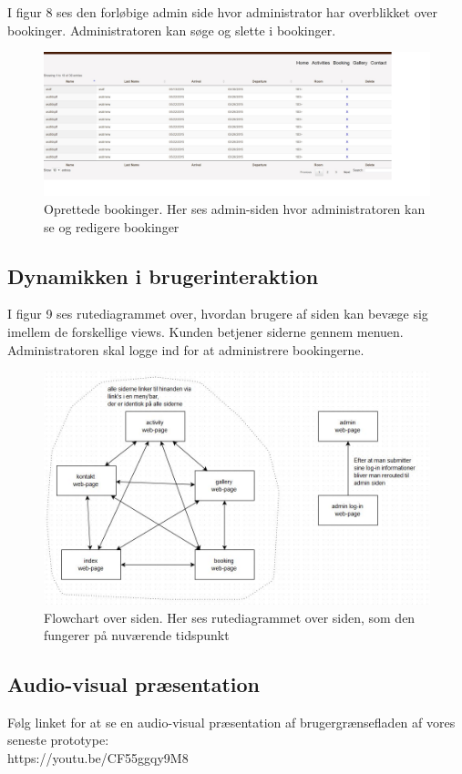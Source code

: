 \documentclass[12pt,a4paper]{article}
\begin{document}
\newpage
I figur 8 ses den forløbige admin side hvor administrator har overblikket
over bookinger. Administratoren kan søge og slette i bookinger. 
\begin{figure}[H]
\centering
\includegraphics[scale=0.4] {brugergransefladebilled3.jpg}
\caption{Oprettede bookinger. Her ses admin-siden hvor administratoren kan se og redigere bookinger}
\end{figure}

\subsection{Dynamikken i brugerinteraktion}
I figur 9 ses rutediagrammet over, 
hvordan brugere af siden kan bevæge sig imellem de forskellige views. 
Kunden betjener siderne gennem menuen.
Administratoren skal logge ind for at administrere bookingerne.
\begin{figure}[H]
\centering
\includegraphics[scale=0.6] {flowchart.jpg}
\caption{Flowchart over siden. Her ses rutediagrammet over siden, som den fungerer på nuværende tidspunkt}
\end{figure}
\newpage
\subsection{Audio-visual præsentation}
Følg linket for at se en audio-visual præsentation af brugergrænsefladen af vores seneste prototype:\\
https://youtu.be/CF55ggqy9M8
\end{document}
